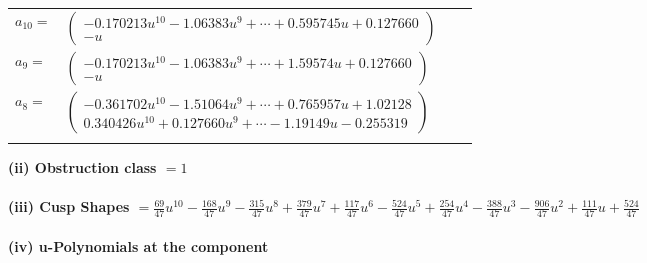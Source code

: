 \documentclass[1p]{elsarticle_modified}
\theoremstyle{definition}
\begin{document}
\begin{tabular}{m{7pt} m{180pt} m{7pt} m{180pt} }
\flushright $a_{10}=$&$\begin{pmatrix}-0.170213 u^{10}-1.06383 u^{9}+\cdots+0.595745 u+0.127660\\- u\end{pmatrix}$ \\
\flushright $a_{9}=$&$\begin{pmatrix}-0.170213 u^{10}-1.06383 u^{9}+\cdots+1.59574 u+0.127660\\- u\end{pmatrix}$ \\
\flushright $a_{8}=$&$\begin{pmatrix}-0.361702 u^{10}-1.51064 u^{9}+\cdots+0.765957 u+1.02128\\0.340426 u^{10}+0.127660 u^{9}+\cdots-1.19149 u-0.255319\end{pmatrix}$\\&\end{tabular}
\flushleft \textbf{(ii) Obstruction class $= 1$}\\~\\
\flushleft \textbf{(iii) Cusp Shapes $= \frac{69}{47} u^{10}-\frac{168}{47} u^9-\frac{315}{47} u^8+\frac{379}{47} u^7+\frac{117}{47} u^6-\frac{524}{47} u^5+\frac{254}{47} u^4-\frac{388}{47} u^3-\frac{906}{47} u^2+\frac{111}{47} u+\frac{524}{47}$}\\~\\
\newpage\renewcommand{\arraystretch}{1}
\flushleft \textbf{(iv) u-Polynomials at the component}\newline \\
\end{document}
